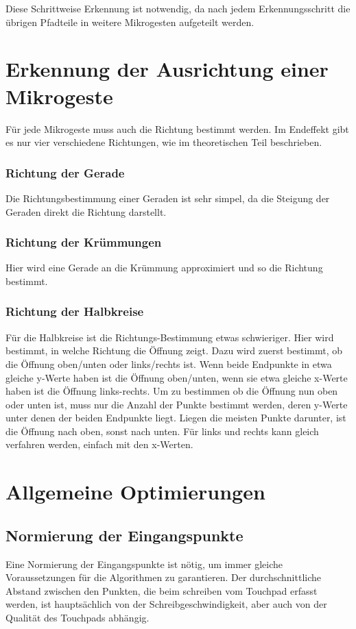 Diese Schrittweise Erkennung ist notwendig, da nach jedem Erkennungsschritt die übrigen Pfadteile in weitere Mikrogesten aufgeteilt werden.


\section{Erkennung der Ausrichtung einer Mikrogeste}
Für jede Mikrogeste muss auch die Richtung bestimmt werden. Im Endeffekt gibt es nur vier verschiedene Richtungen, wie im theoretischen Teil beschrieben. 
\subsubsection{Richtung der Gerade}
Die Richtungsbestimmung einer Geraden ist sehr simpel, da die Steigung der Geraden direkt die Richtung darstellt.
\subsubsection{Richtung der Krümmungen}
Hier wird eine Gerade an die Krümmung approximiert und so die Richtung bestimmt.
\subsubsection{Richtung der Halbkreise}
Für die Halbkreise ist die Richtungs-Bestimmung etwas schwieriger. Hier wird bestimmt, in welche Richtung die Öffnung zeigt.
Dazu wird zuerst bestimmt, ob die Öffnung oben/unten oder links/rechts ist. Wenn beide Endpunkte in etwa gleiche y-Werte haben ist die Öffnung oben/unten, wenn sie etwa gleiche x-Werte haben ist die Öffnung links-rechts.
Um zu bestimmen ob die Öffnung nun oben oder unten ist, muss nur die Anzahl der Punkte bestimmt werden, deren y-Werte unter denen der beiden Endpunkte liegt. Liegen die meisten Punkte darunter, ist die Öffnung nach oben, sonst nach unten. Für links und rechts kann gleich verfahren werden, einfach mit den x-Werten.


\section{Allgemeine Optimierungen}

\subsection{Normierung der Eingangspunkte}
Eine Normierung der Eingangspunkte ist nötig, um immer gleiche Voraussetzungen für die Algorithmen zu garantieren. Der durchschnittliche Abstand zwischen den Punkten, die beim schreiben vom Touchpad erfasst werden, ist hauptsächlich von der Schreibgeschwindigkeit, aber auch von der Qualität des Touchpads abhängig. 

